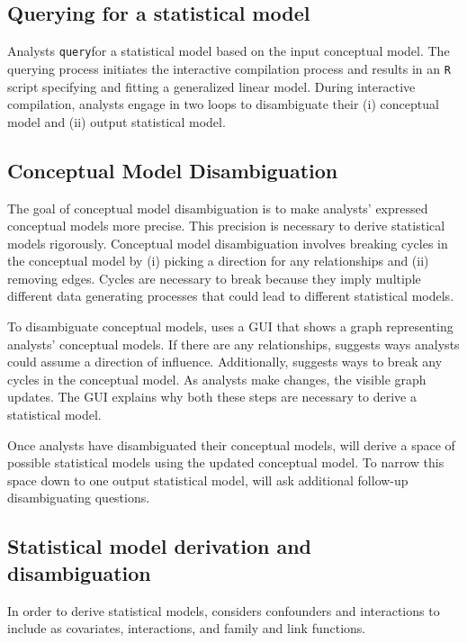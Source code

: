 \def\query{\texttt{query}\xspace}
\subsection{Querying for a statistical model}
Analysts \query \rTisane for a statistical model based on the input conceptual
model. The querying process initiates the interactive compilation process and
results in an \texttt{R} script specifying and fitting a generalized linear
model. During interactive compilation, analysts engage in two loops to
disambiguate their (i) conceptual model and (ii) output statistical model. 

\subsection{Conceptual Model Disambiguation}
The goal of conceptual model disambiguation is to make analysts' expressed
conceptual models more precise. This precision is necessary to derive
statistical models rigorously. Conceptual model disambiguation involves breaking
cycles in the conceptual model by (i) picking a direction for any \relates
relationships and (ii) removing edges. Cycles are necessary to break because
they imply multiple different data generating processes that could lead to
different statistical models. 

To disambiguate conceptual models, \rTisane uses a GUI that shows a graph
representing analysts' conceptual models. If there are any \relates
relationships, \rTisane suggests ways analysts could assume a direction of
influence. Additionally, \rTisane suggests ways to break any cycles in the
conceptual model. As analysts make changes, the visible graph updates. The GUI
explains why both these steps are necessary to derive a statistical model. 

Once analysts have disambiguated their conceptual models, \rTisane will derive a
space of possible statistical models using the updated conceptual model. To
narrow this space down to one output statistical model, \rTisane will ask
additional follow-up disambiguating questions. 

\begin{comment}
This problem is actually challenging because detecting all cycles in a graph is
an NP-hard problem. We adapt a version of Johnson's(?) algorithm.
\end{comment}

\subsection{Statistical model derivation and disambiguation}
In order to derive statistical models, \rTisane considers confounders and
interactions to include as covariates, interactions, and family and link
functions.

